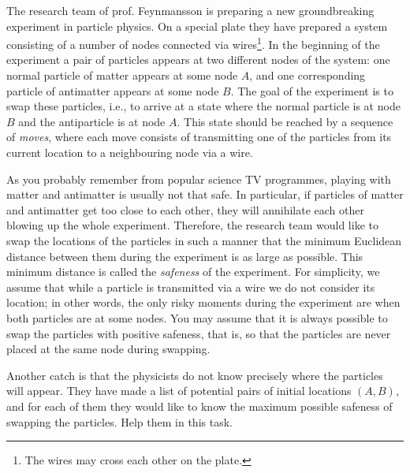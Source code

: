 

The research team of prof. Feynmansson is preparing a new groundbreaking experiment in particle physics. On a special plate they have prepared a system consisting of a number of nodes connected via wires\footnote{The wires may cross each other on the plate.}. In the beginning of the experiment a pair of particles appears at two different nodes of the system: one normal particle of matter appears at some node $A$, and one corresponding particle of antimatter appears at some node $B$. The goal of the experiment is to swap these particles, i.e., to arrive at a state where the normal particle is at node $B$ and the antiparticle is at node $A$. This state should be reached by a sequence of {\em{moves}}, where each move consists of transmitting one of the particles from its current location to a neighbouring node via a wire.

As you probably remember from popular science TV programmes, playing with matter and antimatter is usually not that safe. In particular, if particles of matter and antimatter get too close to each other, they will annihilate each other blowing up the whole experiment. Therefore, the research team would like to swap the locations of the particles in such a manner that the minimum Euclidean distance between them during the experiment is as large as possible. This minimum distance is called the {\em{safeness}} of the experiment. For simplicity, we assume that while a particle is transmitted via a wire we do not consider its location; in other words, the only risky moments during the experiment are when both particles are at some nodes. You may assume that it is always possible to swap the particles with positive safeness, that is, so that the particles are never placed at the same node during swapping.


Another catch is that the physicists do not know precisely where the particles will appear. They have made a list of potential pairs of initial locations $(A,B)$, and for each of them they would like to know the maximum possible safeness of swapping the particles. Help them in this task.

